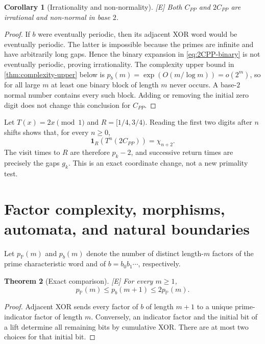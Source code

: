 \documentclass[11pt]{article}
\newtheorem{theorem}{Theorem}[section]
\newtheorem{corollary}[theorem]{Corollary}
\theoremstyle{definition}
\theoremstyle{remark}
\newcommand{\PP}{\mathbb P}
\newcommand{\one}{\mathbf 1}
\newcommand{\status}[1]{\textnormal{\textcolor{accent}{\footnotesize[#1]}}}
\begin{document}
\begin{corollary}[Irrationality and non-normality]\label{cor:CPP-irrational}
\status{E}
Both $C_{PP}$ and $2C_{PP}$ are irrational and non-normal in base $2$.
\end{corollary}

\begin{proof}
If $b$ were eventually periodic, then its adjacent XOR word would be eventually periodic.
The latter is impossible because the primes are infinite and have arbitrarily long gaps.
Hence the binary expansion in \eqref{eq:2CPP-binary} is not eventually periodic, proving
irrationality.  The complexity upper bound in \cref{thm:complexity-upper} below is
$p_b(m)=\exp(O(m/\log m))=o(2^m)$, so for all large $m$ at least one binary block of
length $m$ never occurs.  A base-$2$ normal number contains every such block.  Adding or
removing the initial zero digit does not change this conclusion for $C_{PP}$.
\end{proof}

Let $T(x)=2x\pmod1$ and $R=[1/4,3/4)$.  Reading the first two digits after $n$ shifts
shows that, for every $n\ge0$,
\begin{equation}\label{eq:doubling-detector}
 \one_R\!\left(T^n(2C_{PP})\right)=\chi_{n+2}.
\end{equation}
The visit times to $R$ are therefore $p_k-2$, and successive return times are precisely
the gaps $g_k$.  This is an exact coordinate change, not a new primality test.

\section{Factor complexity, morphisms, automata, and natural boundaries}

Let $p_{\PP}(m)$ and $p_b(m)$ denote the number of distinct length-$m$ factors of the
prime characteristic word and of $b=b_0b_1\cdots$, respectively.

\begin{theorem}[Exact comparison]\label{thm:complexity-comparison}
\status{E}
For every $m\ge1$,
\begin{equation}\label{eq:complexity-comparison}
 p_{\PP}(m)\le p_b(m+1)\le2p_{\PP}(m).
\end{equation}
\end{theorem}

\begin{proof}
Adjacent XOR sends every factor of $b$ of length $m+1$ to a unique prime-indicator
factor of length $m$.  Conversely, an indicator factor and the initial bit of a lift
determine all remaining bits by cumulative XOR.  There are at most two choices for that
initial bit.
\end{proof}
\end{document}
